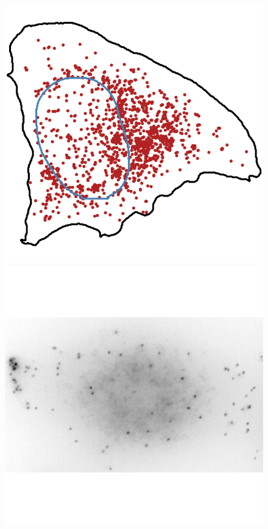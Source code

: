 \begin{figure}[]
		\includegraphics[width=0.95\linewidth]{figures/introduction/real_coord_perinuclear}
	\endminipage\hfill
		\includegraphics[width=0.95\linewidth]{figures/introduction/real_image_protrusion}
		\vfill

\end{figure}
